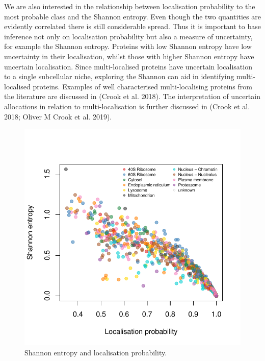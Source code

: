\documentclass[
]{article}
\newenvironment{Shaded}{\begin{snugshade}}{\end{snugshade}}
\newcommand{\DataTypeTok}[1]{\textcolor[rgb]{0.13,0.29,0.53}{#1}}
\newcommand{\DecValTok}[1]{\textcolor[rgb]{0.00,0.00,0.81}{#1}}
\newcommand{\FloatTok}[1]{\textcolor[rgb]{0.00,0.00,0.81}{#1}}
\newcommand{\KeywordTok}[1]{\textcolor[rgb]{0.13,0.29,0.53}{\textbf{#1}}}
\newcommand{\NormalTok}[1]{#1}
\newcommand{\OperatorTok}[1]{\textcolor[rgb]{0.81,0.36,0.00}{\textbf{#1}}}
\newcommand{\StringTok}[1]{\textcolor[rgb]{0.31,0.60,0.02}{#1}}
\begin{document}
We are also interested in the relationship between localisation
probability to the most probable class and the Shannon entropy. Even
though the two quantities are evidently correlated there is still
considerable spread. Thus it is important to base inference not only on
localisation probability but also a measure of uncertainty, for example
the Shannon entropy. Proteins with low Shannon entropy have low
uncertainty in their localisation, whilst those with higher Shannon
entropy have uncertain localisation. Since multi-localised proteins have
uncertain localisation to a single subcellular niche, exploring the
Shannon can aid in identifying multi-localised proteins. Examples of
well characterised multi-localising proteins from the literature are
discussed in (Crook et al. 2018). The interpretation of uncertain
allocations in relation to multi-localisation is further discussed in
(Crook et al. 2018; Oliver M Crook et al. 2019).

\begin{Shaded}
\end{Shaded}

\begin{figure}
\includegraphics[width=0.7\linewidth]{F1000TAGMworkflow_rev1_files/figure-latex/probvsentr-1} \caption{Shannon entropy and localisation probability.}\label{fig:probvsentr}
\end{figure}
\end{document}
